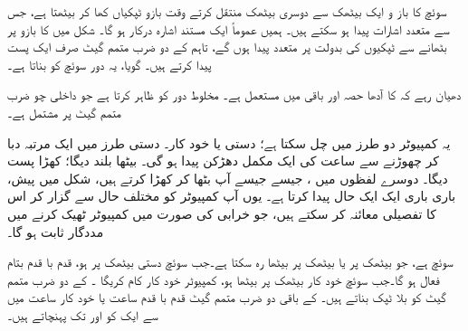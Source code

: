 سوئچ کا باز و ایک بیٹھک سے دوسری  بیٹھک منتقل کرتے وقت  بازو  ٹپکیاں کھا کر بیٹھتا ہے، جس سے متعدد اشارات پیدا ہو سکتے ہیں۔ ہمیں عموماً ایک مستند  اشارہ درکار ہو گا۔ شکل  میں   کا بازو   پر  بٹھانے سے ٹپکیوں کی بدولت   پر متعدد     پیدا ہوں گے، تاہم  کے دو ضرب متمم گیٹ صرف ایک  پست  پیدا کرتے ہیں۔ گویا، یہ دور سوئچ کو  بناتا ہے۔

دھیان رہے کہ  کا آدھا حصہ   اور باقی   میں  مستعمل ہے۔    مخلوط  دور    کو ظاہر کرتا ہے جو   داخلی  چو ضرب  متمم  گیٹ پر مشتمل ہے۔

یہ کمپیوٹر دو  طرز  میں چل سکتا ہے؛ دستی   یا خود کار۔ دستی طرز میں   ایک مرتبہ  دبا کر چھوڑنے سے ساعت کی  ایک مکمل   دھڑکن پیدا ہو گی۔ بیٹھا    بلند  دیگا؛ کھڑا  پست  دیگا۔ دوسرے لفظوں میں ، جیسے جیسے آپ     بٹھا کر  کھڑا کرتے ہیں، شکل   میں پیش،   باری باری ایک ایک  حال پیدا کرتا ہے۔ یوں آپ  کمپیوٹر  کو  مختلف  حال سے گزار کر اس کا تفصیلی معائنہ  کر سکتے ہیں، جو  خرابی کی صورت میں کمپیوٹر ٹھیک کرنے میں مددگار ثابت ہو گا۔

 سوئچ ہے، جو  بیٹھک پر یا   بیٹھک پر بیٹھا  رہ سکتا ہے۔جب سوئچ  دستی بیٹھک پر  ہو، قدم با قدم بتام فعال ہو گا۔جب سوئچ  خود کار بیٹھک پر  بیٹھا ہو، کمپیوٹر خود کار  کام کریگا ۔  کے دو ضرب متمم گیٹ  کو بلا ٹپک بناتے ہیں۔ کے باقی دو  ضرب متمم گیٹ  قدم  با قدم ساعت یا خود کار ساعت  میں سے ایک کو  اور  تک پہنچاتے ہیں۔

